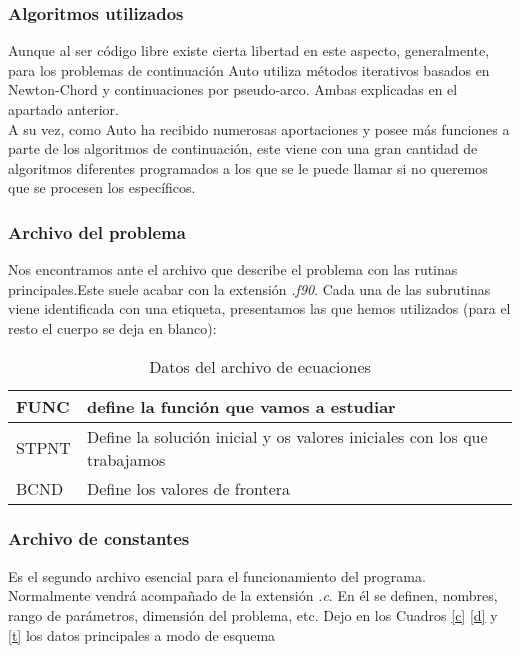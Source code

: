   \subsubsection{Algoritmos utilizados}
  Aunque al ser código libre existe cierta libertad en este aspecto, generalmente, para los problemas de continuación Auto utiliza métodos iterativos basados en Newton-Chord y continuaciones por pseudo-arco. Ambas explicadas en el apartado anterior. \\
  A su vez, como Auto ha recibido numerosas aportaciones y posee más funciones a parte de los algoritmos de continuación, este viene con una gran cantidad de algoritmos diferentes programados a los que se le puede llamar si no queremos que se procesen los específicos.
  
  \subsubsection{Archivo del problema}
  Nos encontramos ante el archivo que describe el problema con las rutinas principales.Este suele acabar con la extensión \textit{.f90}.
  Cada una de las subrutinas viene identificada con una etiqueta, presentamos las que hemos utilizados (para el resto el cuerpo se deja en blanco):
  
  
  \begin{table}[h]
  	\begin{center}
  		\begin{tabular}{|l|l|}
  			\hline
  			FUNC & define la función que vamos a estudiar \\ \hline
  			STPNT & Define la solución inicial y os valores iniciales con los que trabajamos \\ \hline
  			BCND & Define los valores de  frontera \\ \hline
  			
  		\end{tabular}
  		\caption{Datos del archivo de ecuaciones}
  		\label{f90}
  	\end{center}
  \end{table}
  
  
  
  
  
  \subsubsection{Archivo de constantes}
  Es el segundo archivo esencial para el funcionamiento del programa. Normalmente vendrá acompañado de la extensión \textit{.c}.
  En él se definen, nombres, rango de parámetros, dimensión del problema, etc. Dejo en los Cuadros \ref{c} \ref{d} y \ref{t} los datos principales a modo de esquema

